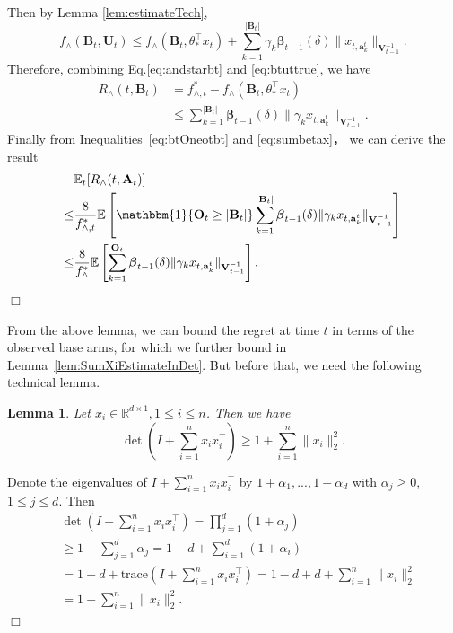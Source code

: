\documentclass{article}
\newcommand{\bbeta}{\boldsymbol{\beta}}
\newcommand{\EE}{\mathbb{E}}
\newcommand{\RR}{\mathbb{R}}
\newcommand{\bOne}{\mathbbm{1}}
\newcommand{\bA}{\mathbf{A}}
\newcommand{\ba}{\mathbf{a}}
\newcommand{\bB}{\mathbf{B}}
\newcommand{\bO}{\mathbf{O}}
\newcommand{\bU}{\mathbf{U}}
\newcommand{\bV}{\mathbf{V}}
\newcommand{\trace}{\mathrm{trace}}
\newcommand{\abs}[1]{\left| #1 \right|}
\newcommand{\norm}[1]{\| #1 \|}
\newtheorem{lemma}[theorem]{Lemma}%
\newenvironment{proof}{\noindent {\textbf{Proof. }}}{$\Box$ \medskip}
\begin{document}
\begin{proof}
  Then by Lemma \ref{lem:estimateTech},
  \begin{equation} \label{eq:btuttrue}
    f_{\wedge}(\bB_t,\bU_t) \leq f_{\wedge}(\bB_t, \theta_*^{\top}x_t) + \sum_{k=1}^{\abs{\bB_t}}\gamma_k\bbeta_{t-1}(\delta)\norm{x_{t,\ba_k^t}}_{\bV_{t-1}^{-1}}.
  \end{equation}
  Therefore, combining Eq.\eqref{eq:andstarbt} and \eqref{eq:btuttrue}, we have
  \begin{align}
    R_{\wedge}(t, \bB_t) & = f_{\wedge, t}^{\ast} - f_{\wedge}(\bB_t, \theta_{\ast}^{\top}x_t) \nonumber \\
    & \leq \sum_{k=1}^{\abs{\bB_t}}\bbeta_{t-1}(\delta)\norm{\gamma_k x_{t,\ba_k^t}}_{\bV_{t-1}^{-1}}. \label{eq:sumbetax}
  \end{align}
  Finally from Inequalities~\eqref{eq:btOneotbt} and \eqref{eq:sumbetax}， we can derive the result
  \begin{align*}
    &\EE_t[R_{\wedge}(t, \bA_t)] \\
    \leq& \frac{8}{f_{\wedge, t}^*} \EE \left[\bOne\{ \bO_t \geq \abs{\bB_t} \}\sum_{k=1}^{\abs{\bB_t}}\bbeta_{t-1}(\delta)\norm{\gamma_k x_{t,\ba_k^t}}_{\bV_{t-1}^{-1}} \right]\\
    \leq& \frac{8}{f_{\wedge}^*} \EE \left[ \sum_{k=1}^{ \bO_t } \bbeta_{t-1}(\delta) \norm{\gamma_k x_{t,\ba_k^t}}_{\bV_{t-1}^{-1}} \right].
  \end{align*}
\end{proof}

From the above lemma, we can bound the regret at time $t$ in terms of the observed base arms, for which we further bound in Lemma~\ref{lem:SumXiEstimateInDet}.
But before that, we need the following technical lemma.

\begin{lemma} %
  \label{lem:detTech}
  Let $x_i \in \RR^{d \times 1}, 1 \leq i \leq n$. Then we have
  $$
    \det\left(I + \sum_{i=1}^n x_i x_i^{\top}\right) \geq 1 + \sum_{i=1}^n \norm{x_i}_2^2.
  $$
\end{lemma}
\begin{proof}
  Denote the eigenvalues of $I + \sum_{i=1}^n x_i x_i^{\top}$ by $1+\alpha_1,...,1+\alpha_d$ with $\alpha_j \geq 0$, $1\leq j\leq d$. Then
  \begin{align*}
    &\det(I + \sum_{i=1}^n x_i x_i^{\top})= \prod_{j=1}^d (1 + \alpha_j)\\
    &\geq 1 +\sum_{j=1}^d \alpha_j =1-d + \sum_{i=1}^d (1+\alpha_i) \\
    &=1-d + \trace(I + \sum_{i=1}^n x_i x_i^{\top})= 1-d + d + \sum_{i=1}^n \norm{x_i}_2^2\\
    &=1 + \sum_{i=1}^n \norm{x_i}_2^2.
  \end{align*}
\end{proof}
\end{document}
